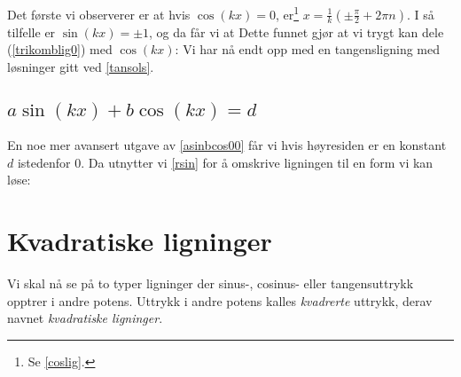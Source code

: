 Det første vi observerer er at hvis $ \cos(kx)=0 $, er\footnote{Se \eqref{coslig}.} $ x=\frac{1}{k}\left(\pm\frac{\pi }{2}+2\pi n\right) $. I så tilfelle er $ \sin
(kx)=\pm 1 $, og da får vi at
Dette funnet gjør at vi trygt kan dele (\ref{trikomblig0}) med $ \cos (kx) $:
Vi har nå endt opp med en tangensligning med løsninger gitt ved \eqref{tansols}.
\asinbcos
{}
\subsection[$ a\sin (kx) + b\cos (kx) =d $]{\boldmath $ a\sin (kx) + b\cos (kx) =d $}
En noe mer avansert utgave av \eqref{asinbcos00} får vi hvis høyresiden er en konstant $ d $ istedenfor 0. Da utnytter vi \eqref{rsin} for å omskrive ligningen til en form vi kan løse:\regv
\asinbcosd
{}
\section{Kvadratiske ligninger}
Vi skal nå se på to typer ligninger der sinus-, cosinus- eller tangensuttrykk opptrer i andre potens. Uttrykk i andre potens kalles \textit{kvadrerte} uttrykk, derav navnet \textit{kvadratiske ligninger}.

